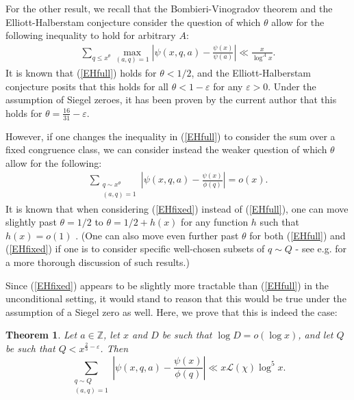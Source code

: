 \documentclass{amsart}
\newtheorem{theorem}{Theorem}[section]
\begin{document}
For the other result, we recall that the Bombieri-Vinogradov theorem and the Elliott-Halberstam conjecture consider the question of which $\theta$ allow for the following inequality to hold for arbitrary $A$:
\begin{gather}\label{EHfull}\sum_{q\leq x^\theta}\max_{(a,q)=1}\left|\psi(x,q,a)-\frac{\psi(x)}{\psi(a)}\right|\ll \frac{x}{\log^A x}.
\end{gather}
It is known that (\ref{EHfull}) holds for $\theta<1/2$, and the Elliott-Halberstam conjecture posits that this holds for all $\theta<1-\varepsilon$ for any $\varepsilon>0$.  Under the assumption of Siegel zeroes, it has been proven by the current author \cite{WrSiAP} that this holds for $\theta=\frac{16}{31}-\varepsilon$.

However, if one changes the inequality in (\ref{EHfull}) to consider the sum over a fixed congruence class, we can consider instead the weaker question of which $\theta$ allow for the following:
\begin{gather}\label{EHfixed}\sum_{\substack{q\sim x^\theta \\ (a,q)=1}}\left|\psi(x,q,a)-\frac{\psi(x)}{\phi(q)}\right|=o\left(x\right).
\end{gather}
It is known that when considering (\ref{EHfixed}) instead of (\ref{EHfull}), one can move slightly past $\theta=1/2$ to $\theta=1/2+h(x)$ for any function $h$ such that $h(x)=o(1)$ \cite{BFI}. (One can also move even further past $\theta$ for both (\ref{EHfull}) and (\ref{EHfixed}) if one is to consider specific well-chosen subsets of $q\sim Q$ - see e.g. \cite{MaWF1} for a more thorough discussion of such results.)

Since (\ref{EHfixed}) appears to be slightly more tractable than (\ref{EHfull}) in the unconditional setting, it would stand to reason that this would be true under the assumption of a Siegel zero as well.  Here, we prove that this is indeed the case:



\begin{theorem}\label{Main2}
Let $a\in \mathbb Z$, let $x$ and $D$ be such that $\log D=o(\log x)$, and let $Q$ be such that $Q<x^{\frac 23-\varepsilon}$.  Then
$$\sum_{\substack{q\sim Q \\ (a,q)=1}}\left|\psi(x,q,a)-\frac{\psi(x)}{\phi(q)}\right|\ll x\mathcal L(\chi)\log^5 x.$$
\end{theorem}
\end{document}
